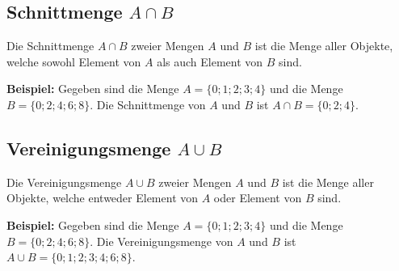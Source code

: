 \subsection{Schnittmenge $A \cap B$}
Die Schnittmenge $A \cap B$ zweier Mengen $A$ und $B$ ist die Menge aller Objekte, welche sowohl Element von $A$ als auch Element von $B$ sind.
\begin{center}
\end{center}
\begin{example}
  \textbf{Beispiel:} Gegeben sind die Menge $A = \{0;1;2;3;4\}$ und die Menge $B = \{0;2;4;6;8\}$. Die Schnittmenge von $A$ und $B$ ist $A \cap B = \{0;2;4\}$.
\end{example}

\subsection{Vereinigungsmenge $A \cup B$}
Die Vereinigungsmenge $A \cup B$ zweier Mengen $A$ und $B$ ist die Menge aller Objekte, welche entweder Element von $A$ oder Element von $B$ sind.
\begin{center}
\end{center}
\begin{example}
  \textbf{Beispiel:} Gegeben sind die Menge $A = \{0;1;2;3;4\}$ und die Menge $B = \{0;2;4;6;8\}$. Die Vereinigungsmenge von $A$ und $B$ ist $A \cup B = \{0;1;2;3;4;6;8\}$.
\end{example}

